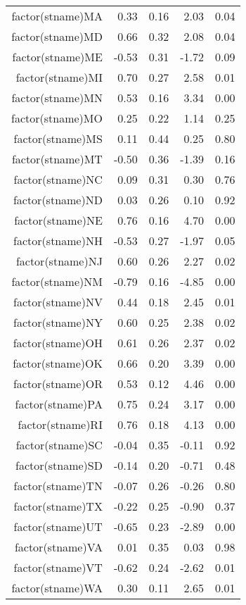 \begin{table}[ht]
\begin{tabular}{rrrrr}
  factor(stname)MA & 0.33 & 0.16 & 2.03 & 0.04 \\ 
  factor(stname)MD & 0.66 & 0.32 & 2.08 & 0.04 \\ 
  factor(stname)ME & -0.53 & 0.31 & -1.72 & 0.09 \\ 
  factor(stname)MI & 0.70 & 0.27 & 2.58 & 0.01 \\ 
  factor(stname)MN & 0.53 & 0.16 & 3.34 & 0.00 \\ 
  factor(stname)MO & 0.25 & 0.22 & 1.14 & 0.25 \\ 
  factor(stname)MS & 0.11 & 0.44 & 0.25 & 0.80 \\ 
  factor(stname)MT & -0.50 & 0.36 & -1.39 & 0.16 \\ 
  factor(stname)NC & 0.09 & 0.31 & 0.30 & 0.76 \\ 
  factor(stname)ND & 0.03 & 0.26 & 0.10 & 0.92 \\ 
  factor(stname)NE & 0.76 & 0.16 & 4.70 & 0.00 \\ 
  factor(stname)NH & -0.53 & 0.27 & -1.97 & 0.05 \\ 
  factor(stname)NJ & 0.60 & 0.26 & 2.27 & 0.02 \\ 
  factor(stname)NM & -0.79 & 0.16 & -4.85 & 0.00 \\ 
  factor(stname)NV & 0.44 & 0.18 & 2.45 & 0.01 \\ 
  factor(stname)NY & 0.60 & 0.25 & 2.38 & 0.02 \\ 
  factor(stname)OH & 0.61 & 0.26 & 2.37 & 0.02 \\ 
  factor(stname)OK & 0.66 & 0.20 & 3.39 & 0.00 \\ 
  factor(stname)OR & 0.53 & 0.12 & 4.46 & 0.00 \\ 
  factor(stname)PA & 0.75 & 0.24 & 3.17 & 0.00 \\ 
  factor(stname)RI & 0.76 & 0.18 & 4.13 & 0.00 \\ 
  factor(stname)SC & -0.04 & 0.35 & -0.11 & 0.92 \\ 
  factor(stname)SD & -0.14 & 0.20 & -0.71 & 0.48 \\ 
  factor(stname)TN & -0.07 & 0.26 & -0.26 & 0.80 \\ 
  factor(stname)TX & -0.22 & 0.25 & -0.90 & 0.37 \\ 
  factor(stname)UT & -0.65 & 0.23 & -2.89 & 0.00 \\ 
  factor(stname)VA & 0.01 & 0.35 & 0.03 & 0.98 \\ 
  factor(stname)VT & -0.62 & 0.24 & -2.62 & 0.01 \\ 
  factor(stname)WA & 0.30 & 0.11 & 2.65 & 0.01 \\ 

\end{tabular}
\end{table}
